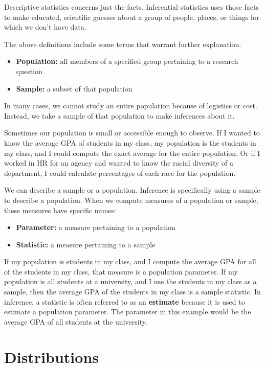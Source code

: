 \documentclass[
]{book}
\providecommand{\tightlist}{%
  \setlength{\itemsep}{0pt}\setlength{\parskip}{0pt}}
\begin{document}
Descriptive statistics concerns just the facts. Inferential statistics uses those facts to make educated, scientific guesses about a group of people, places, or things for which we don't have data.

The above definitions include some terms that warrant further explanation.

\begin{itemize}
\tightlist
\item
  \textbf{Population:} all members of a specified group pertaining to a research question
\item
  \textbf{Sample:} a subset of that population
\end{itemize}

In many cases, we cannot study an entire population because of logistics or cost. Instead, we take a sample of that population to make inferences about it.

Sometimes our population is small or accessible enough to observe. If I wanted to know the average GPA of students in my class, my population is the students in my class, and I could compute the exact average for the entire population. Or if I worked in HR for an agency and wanted to know the racial diversity of a department, I could calculate percentages of each race for the population.

We can describe a sample or a population. Inference is specifically using a sample to describe a population. When we compute measures of a population or sample, these measures have specific names:

\begin{itemize}
\tightlist
\item
  \textbf{Parameter:} a measure pertaining to a population
\item
  \textbf{Statistic:} a measure pertaining to a sample
\end{itemize}

If my population is students in my class, and I compute the average GPA for all of the students in my class, that measure is a population parameter. If my population is all students at a university, and I use the students in my class as a sample, then the average GPA of the students in my class is a sample statistic. In inference, a statistic is often referred to as an \textbf{estimate} because it is used to estimate a population parameter. The parameter in this example would be the average GPA of all students at the university.

\hypertarget{distributions}{%
\section{Distributions}\label{distributions}}
\end{document}
